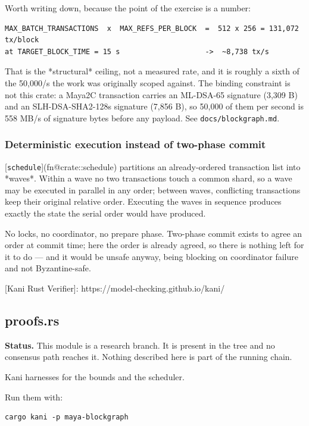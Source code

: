 \documentclass[11pt,a4paper]{article}
\begin{document}
Worth writing down, because the point of the exercise is a number:

\begin{verbatim}
MAX_BATCH_TRANSACTIONS  x  MAX_REFS_PER_BLOCK  =  512 x 256 = 131,072 tx/block
at TARGET_BLOCK_TIME = 15 s                    ->  ~8,738 tx/s
\end{verbatim}

That is the *structural* ceiling, not a measured rate, and it is roughly a
sixth of the 50,000/s the work was originally scoped against. The binding
constraint is not this crate: a Maya2C transaction carries an ML-DSA-65
signature (3,309 B) and an SLH-DSA-SHA2-128s signature (7,856 B), so 50,000
of them per second is 558 MB/s of signature bytes before any payload. See
\texttt{docs/blockgraph.md}.

\subsubsection{Deterministic execution instead of two-phase commit}

[\texttt{schedule}](fn@crate::schedule) partitions an already-ordered transaction list into *waves*.
Within a wave no two transactions touch a common shard, so a wave may be
executed in parallel in any order; between waves, conflicting transactions
keep their original relative order. Executing the waves in sequence produces
exactly the state the serial order would have produced.

No locks, no coordinator, no prepare phase. Two-phase commit exists to agree
an order at commit time; here the order is already agreed, so there is
nothing left for it to do — and it would be unsafe anyway, being blocking on
coordinator failure and not Byzantine-safe.

[Kani Rust Verifier]: https://model-checking.github.io/kani/

\subsection{proofs.rs}
\begin{framed}\noindent\textbf{Status.} This module is a research branch. It is present in the tree and no consensus path reaches it. Nothing described here is part of the running chain.\end{framed}

Kani harnesses for the bounds and the scheduler.

Run them with:

\begin{verbatim}
cargo kani -p maya-blockgraph
\end{verbatim}
\end{document}

